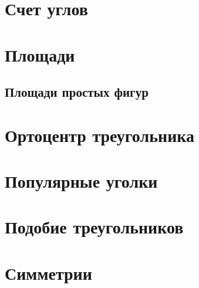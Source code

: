 \documentclass[twoside]{article}
\begin{document}
\pagestyle{empty}

% 


\newpage

\tableofcontents
\newpage

\setcounter{page}{1}
\pagestyle{fancy}


\section{Счет углов}


% 

\section{Площади}
\subsection{Площади простых фигур}

\section{Ортоцентр треугольника}


% 
\section{Популярные уголки}


\section{Подобие треугольников}


\section{Симметрии}
\end{document}
